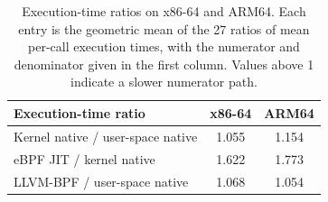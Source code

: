\begin{table}[t]
\centering
\small
\caption{Execution-time ratios on x86-64 and ARM64. Each entry is the geometric mean of the 27 ratios of mean per-call execution times, with the numerator and denominator given in the first column. Values above 1 indicate a slower numerator path.}
\label{tab:char-micro-summary}
\begin{tabular}{@{}lcc@{}}
\toprule
\textbf{Execution-time ratio} & \textbf{x86-64} & \textbf{ARM64} \\
\midrule
Kernel native / user-space native & 1.055 & 1.154 \\
\addlinespace
eBPF JIT / kernel native & 1.622 & 1.773 \\
\addlinespace
LLVM-BPF / user-space native & 1.068 & 1.054 \\
\bottomrule
\end{tabular}
\end{table}
